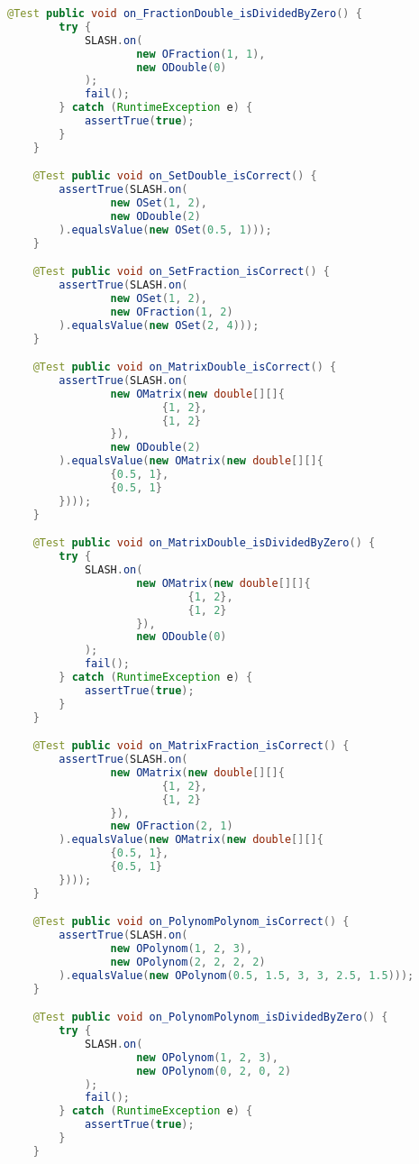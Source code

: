 \begin{lstlisting}[caption=SlashTest (Schwenke),label=list:SlashTest,language=Java]
    @Test public void on_FractionDouble_isDividedByZero() {
        try {
            SLASH.on(
                    new OFraction(1, 1),
                    new ODouble(0)
            );
            fail();
        } catch (RuntimeException e) {
            assertTrue(true);
        }
    }

    @Test public void on_SetDouble_isCorrect() {
        assertTrue(SLASH.on(
                new OSet(1, 2),
                new ODouble(2)
        ).equalsValue(new OSet(0.5, 1)));
    }

    @Test public void on_SetFraction_isCorrect() {
        assertTrue(SLASH.on(
                new OSet(1, 2),
                new OFraction(1, 2)
        ).equalsValue(new OSet(2, 4)));
    }

    @Test public void on_MatrixDouble_isCorrect() {
        assertTrue(SLASH.on(
                new OMatrix(new double[][]{
                        {1, 2},
                        {1, 2}
                }),
                new ODouble(2)
        ).equalsValue(new OMatrix(new double[][]{
                {0.5, 1},
                {0.5, 1}
        })));
    }

    @Test public void on_MatrixDouble_isDividedByZero() {
        try {
            SLASH.on(
                    new OMatrix(new double[][]{
                            {1, 2},
                            {1, 2}
                    }),
                    new ODouble(0)
            );
            fail();
        } catch (RuntimeException e) {
            assertTrue(true);
        }
    }

    @Test public void on_MatrixFraction_isCorrect() {
        assertTrue(SLASH.on(
                new OMatrix(new double[][]{
                        {1, 2},
                        {1, 2}
                }),
                new OFraction(2, 1)
        ).equalsValue(new OMatrix(new double[][]{
                {0.5, 1},
                {0.5, 1}
        })));
    }

    @Test public void on_PolynomPolynom_isCorrect() {
        assertTrue(SLASH.on(
                new OPolynom(1, 2, 3),
                new OPolynom(2, 2, 2, 2)
        ).equalsValue(new OPolynom(0.5, 1.5, 3, 3, 2.5, 1.5)));
    }

    @Test public void on_PolynomPolynom_isDividedByZero() {
        try {
            SLASH.on(
                    new OPolynom(1, 2, 3),
                    new OPolynom(0, 2, 0, 2)
            );
            fail();
        } catch (RuntimeException e) {
            assertTrue(true);
        }
    }


\end{lstlisting}
